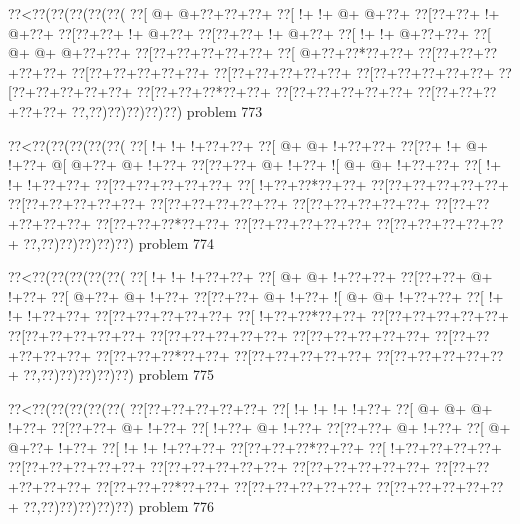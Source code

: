\vbox{\vbox{\goo
\0??<\0??(\0??(\0??(\0??(\0??(
\0??[\- @+\- @+\0??+\0??+\0??+
\0??[\- !+\- !+\- @+\- @+\0??+
\0??[\0??+\0??+\- !+\- @+\0??+
\0??[\0??+\0??+\- !+\- @+\0??+
\0??[\0??+\0??+\- !+\- @+\0??+
\0??[\- !+\- !+\- @+\0??+\0??+
\0??[\- @+\- @+\- @+\0??+\0??+
\0??[\0??+\0??+\0??+\0??+\0??+
\0??[\- @+\0??+\0??*\0??+\0??+
\0??[\0??+\0??+\0??+\0??+\0??+
\0??[\0??+\0??+\0??+\0??+\0??+
\0??[\0??+\0??+\0??+\0??+\0??+
\0??[\0??+\0??+\0??+\0??+\0??+
\0??[\0??+\0??+\0??+\0??+\0??+
\0??[\0??+\0??+\0??*\0??+\0??+
\0??[\0??+\0??+\0??+\0??+\0??+
\0??[\0??+\0??+\0??+\0??+\0??+
\0??,\0??)\0??)\0??)\0??)\0??)
}
\hfil problem 773\hfil\break
}

\vbox{\vbox{\goo
\0??<\0??(\0??(\0??(\0??(\0??(
\0??[\- !+\- !+\- !+\0??+\0??+
\0??[\- @+\- @+\- !+\0??+\0??+
\0??[\0??+\- !+\- @+\- !+\0??+
\- @[\- @+\0??+\- @+\- !+\0??+
\0??[\0??+\0??+\- @+\- !+\0??+
\- ![\- @+\- @+\- !+\0??+\0??+
\0??[\- !+\- !+\- !+\0??+\0??+
\0??[\0??+\0??+\0??+\0??+\0??+
\0??[\- !+\0??+\0??*\0??+\0??+
\0??[\0??+\0??+\0??+\0??+\0??+
\0??[\0??+\0??+\0??+\0??+\0??+
\0??[\0??+\0??+\0??+\0??+\0??+
\0??[\0??+\0??+\0??+\0??+\0??+
\0??[\0??+\0??+\0??+\0??+\0??+
\0??[\0??+\0??+\0??*\0??+\0??+
\0??[\0??+\0??+\0??+\0??+\0??+
\0??[\0??+\0??+\0??+\0??+\0??+
\0??,\0??)\0??)\0??)\0??)\0??)
}
\hfil problem 774\hfil\break
}

\vbox{\vbox{\goo
\0??<\0??(\0??(\0??(\0??(\0??(
\0??[\- !+\- !+\- !+\0??+\0??+
\0??[\- @+\- @+\- !+\0??+\0??+
\0??[\0??+\0??+\- @+\- !+\0??+
\0??[\- @+\0??+\- @+\- !+\0??+
\0??[\0??+\0??+\- @+\- !+\0??+
\- ![\- @+\- @+\- !+\0??+\0??+
\0??[\- !+\- !+\- !+\0??+\0??+
\0??[\0??+\0??+\0??+\0??+\0??+
\0??[\- !+\0??+\0??*\0??+\0??+
\0??[\0??+\0??+\0??+\0??+\0??+
\0??[\0??+\0??+\0??+\0??+\0??+
\0??[\0??+\0??+\0??+\0??+\0??+
\0??[\0??+\0??+\0??+\0??+\0??+
\0??[\0??+\0??+\0??+\0??+\0??+
\0??[\0??+\0??+\0??*\0??+\0??+
\0??[\0??+\0??+\0??+\0??+\0??+
\0??[\0??+\0??+\0??+\0??+\0??+
\0??,\0??)\0??)\0??)\0??)\0??)
}
\hfil problem 775\hfil\break
}

\vbox{\vbox{\goo
\0??<\0??(\0??(\0??(\0??(\0??(
\0??[\0??+\0??+\0??+\0??+\0??+
\0??[\- !+\- !+\- !+\- !+\0??+
\0??[\- @+\- @+\- @+\- !+\0??+
\0??[\0??+\0??+\- @+\- !+\0??+
\0??[\- !+\0??+\- @+\- !+\0??+
\0??[\0??+\0??+\- @+\- !+\0??+
\0??[\- @+\- @+\0??+\- !+\0??+
\0??[\- !+\- !+\- !+\0??+\0??+
\0??[\0??+\0??+\0??*\0??+\0??+
\0??[\- !+\0??+\0??+\0??+\0??+
\0??[\0??+\0??+\0??+\0??+\0??+
\0??[\0??+\0??+\0??+\0??+\0??+
\0??[\0??+\0??+\0??+\0??+\0??+
\0??[\0??+\0??+\0??+\0??+\0??+
\0??[\0??+\0??+\0??*\0??+\0??+
\0??[\0??+\0??+\0??+\0??+\0??+
\0??[\0??+\0??+\0??+\0??+\0??+
\0??,\0??)\0??)\0??)\0??)\0??)
}
\hfil problem 776\hfil\break
}

